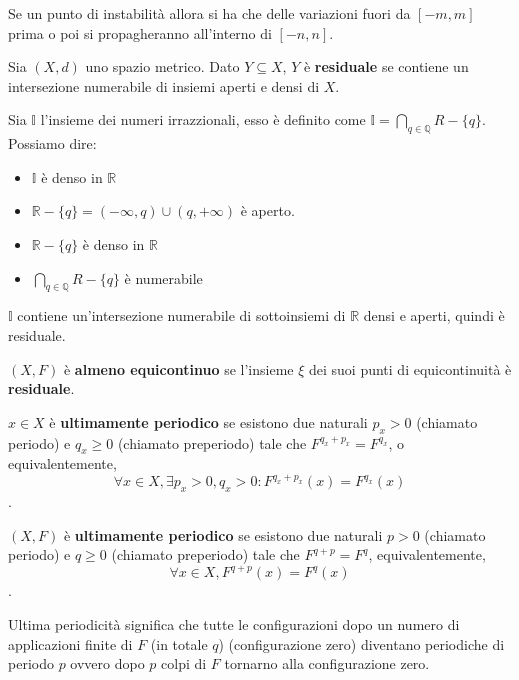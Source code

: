 Se un punto di instabilità allora si ha che delle variazioni fuori da $[-m,m]$
prima o poi si propagheranno all'interno di $[-n,n]$.

\begin{definizione}
    Sia $(X,d)$ uno spazio metrico. Dato $Y\subseteq X$, $Y$ è \textbf{residuale}
    se contiene un intersezione numerabile di insiemi aperti e densi di $X$.
\end{definizione}
\begin{esempio}
    Sia $\mathbb{I}$ l'insieme dei numeri irrazzionali, esso è definito come
    $\mathbb{I} =\bigcap_{q\in \mathbb{Q}} R-\{q\}$.
    Possiamo dire:
    \begin{itemize}
        \item $\mathbb{I}$ è denso in $\mathbb{R}$
        \item $\mathbb{R} - \{q\} = \left(-\infty, q\right)\cup \left(q,+\infty\right)$ è aperto.
        \item $\mathbb{R} - \{q\}$ è denso in $\mathbb{R}$
        \item $\bigcap_{q\in \mathbb{Q}} R-\{q\}$ è numerabile
    \end{itemize}
    $\mathbb{I}$ contiene un'intersezione numerabile di sottoinsiemi di $\mathbb{R}$ densi e aperti, quindi è residuale.
\end{esempio}

\begin{definizione}
    $(X,F)$ è \textbf{almeno equicontinuo} se l'insieme $\xi$ dei suoi punti di
    equicontinuità è \textbf{residuale}.
\end{definizione}
\begin{definizione}
    $x\in X $ è \textbf{ultimamente periodico} se esistono due naturali $p_x>0$ (chiamato
    periodo) e $q_x\ge 0$ (chiamato preperiodo) tale che $F^{q_x+p_x} = F^{q_x}$, o
    equivalentemente,
    $$\forall x\in X,\exists p_x>0,q_x>0:F^{q_x+p_x}(x) = F^{q_x}(x)$$.
\end{definizione}
\begin{definizione}
    $(X,F)$ è \textbf{ultimamente periodico} se esistono due naturali $p>0$ (chiamato
    periodo) e $q\ge 0$ (chiamato preperiodo) tale che $F^{q+p} = F^q$, equivalentemente,
    $$\forall x\in X,F^{q+p}(x) = F^q(x)$$.
\end{definizione}
Ultima periodicità significa che tutte le configurazioni dopo un numero di applicazioni
finite di $F$ (in totale $q$) (configurazione zero) diventano periodiche di periodo $p$ ovvero dopo
$p$ colpi di $F$ tornarno alla configurazione zero.

